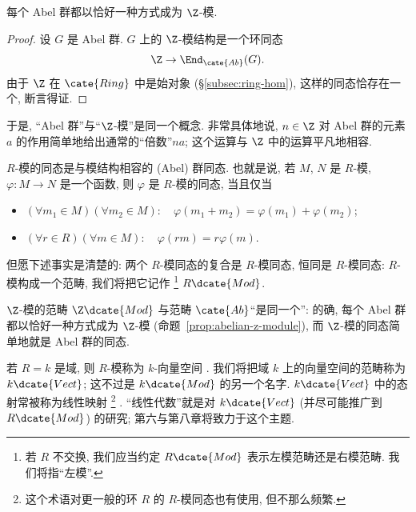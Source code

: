 \begin{proposition}
\label{prop:abelian-z-module}
每个 Abel 群都以恰好一种方式成为 $\Z$-模.
\end{proposition}

\begin{proof}
设 $G$ 是 Abel 群. $G$ 上的 $\Z$-模结构是一个环同态
\[
\Z \to \End_{\cate{Ab}}(G).
\]
由于 $\Z$ 在 $\cate{Ring}$ 中是始对象 (\S\ref{subsec:ring-hom}), 这样的同态恰存在一个, 断言得证.
\end{proof}

于是, ``Abel 群''与``$\Z$-模''是同一个概念. 非常具体地说, $n \in \Z$ 对 Abel 群的元素 $a$ 的作用简单地给出通常的``倍数''$na$; 这个运算与 $\Z$ 中的运算平凡地相容.

$R$-模的同态是与模结构相容的 (Abel) 群同态. 也就是说, 若 $M$, $N$ 是 $R$-模, $\varphi : M \to N$ 是一个函数, 则 $\varphi$ 是 $R$-模的同态, 当且仅当
\begin{itemize}
	\item $(\forall m_1 \in M) (\forall m_2 \in M): \quad \varphi(m_1 + m_2) = \varphi(m_1) + \varphi(m_2)$;
	\item $(\forall r \in R) (\forall m \in M): \quad \varphi(rm) = r\varphi(m)$.
\end{itemize}
但愿下述事实是清楚的: 两个 $R$-模同态的复合是 $R$-模同态, 恒同是 $R$-模同态: $R$-模构成一个范畴, 我们将把它记作%
\footnote{若 $R$ 不交换, 我们应当约定 $R\dcate{Mod}$ 表示左模范畴还是右模范畴. 我们将指``左模''.}%
$R\dcate{Mod}$.

\begin{example}
\label{ex:Z-Mod-Ab}
$\Z$-模的范畴 $\Z\dcate{Mod}$ 与范畴 $\cate{Ab}$``是同一个'': 的确, 每个 Abel 群都以恰好一种方式成为 $\Z$-模 (命题~\ref{prop:abelian-z-module}), 而 $\Z$-模的同态简单地就是 Abel 群的同态.
\end{example}

\begin{example}
\label{ex:vector-spaces}
若 $R = k$ 是域, 则 $R$-模称为 $k$-向量空间%
. 我们将把域 $k$ 上的向量空间的范畴称为 $k\dcate{Vect}$; 这不过是 $k\dcate{Mod}$ 的另一个名字. $k\dcate{Vect}$ 中的态射常被称为线性映射%
\footnote{这个术语对更一般的环 $R$ 的 $R$-模同态也有使用, 但不那么频繁.}%
. ``线性代数''就是对 $k\dcate{Vect}$ (并尽可能推广到 $R\dcate{Mod}$) 的研究; 第六与第八章将致力于这个主题.
\end{example}

